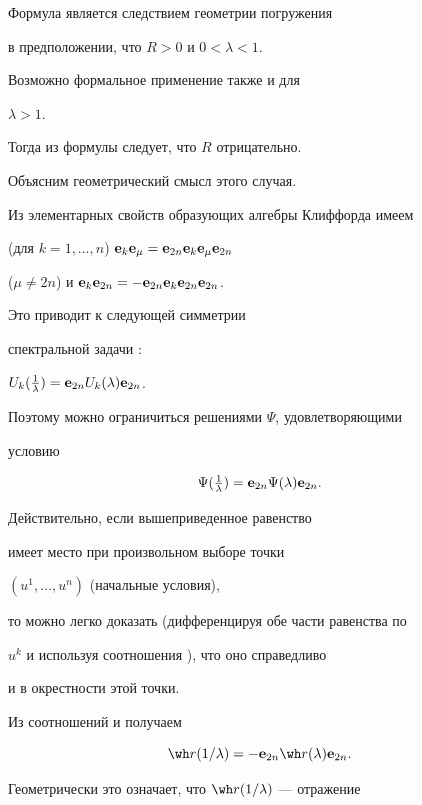Формула  является следствием геометрии погружения


в предположении, что $R > 0$ и $0 < \lambda < 1$.


Возможно формальное применение также и для


$\lambda > 1$.


Тогда из формулы  следует, что $R$ отрицательно.


Объясним геометрический смысл этого случая.


Из элементарных свойств образующих алгебры Клиффорда имеем


(для $k=1,\dotsc,n$) $\bold e_k \bold e_\mu = \bold e_{2n} \bold e_k \bold e_\mu \bold e_{2n}$


($\mu\neq 2n$) и $\bold e_k \bold e_{2n} = - \bold e_{2n} \bold e_k \bold e_{2n} \bold e_{2n}$.


Это приводит к следующей симметрии


спектральной задачи :


$U_k (\tfrac{1}{\lambda}) = \bold e_{2n} U_k (\lambda) \bold e_{2n}$.


Поэтому можно ограничиться решениями $\Psi$, удовлетворяющими


условию


\begin{equation}


\label{inv}


\Psi (\tfrac{1}{\lambda}) = \e_{2n} \Psi (\lambda) \e_{2n}.


\end{equation}


Действительно, если вышеприведенное равенство


имеет место при произвольном выборе точки


$(u^1,\dotsc,u^n)$ (начальные условия),


то можно легко доказать (дифференцируя обе части равенства по


$u^k$ и используя соотношения ), что оно справедливо


и в окрестности этой точки.


Из соотношений  и  получаем


\begin{equation}


\label{reflect}


{\wh r} (1/\lambda) = - \e_{2n} {\wh r} (\lambda) \e_{2n}.


\end{equation}


Геометрически это означает, что ${\wh r} (1/\lambda)$ --- отражение


